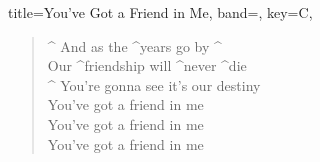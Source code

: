 \documentclass{article}
\begin{document}
\begin{song}{
  title={You've Got a Friend in Me},
    band={\band},
    key={C},
}
\begin{verse}
  ^ And as the ^years go by ^ {} \\
  Our ^friendship will ^never ^die {} \\
  ^ You're gonna see it's our destiny \\
  You've got a friend in me \\
  You've got a friend in me \\
  You've got a friend in me \\
  \introchords
\end{verse}


\end{song}
\end{document}
